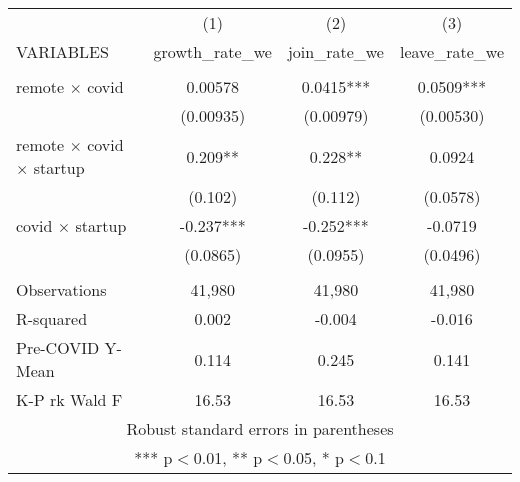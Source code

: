 \begin{tabular}{lccc} \hline
 & (1) & (2) & (3) \\
VARIABLES & growth\_rate\_we & join\_rate\_we & leave\_rate\_we \\ \hline
 &  &  &  \\
remote $\times$ covid & 0.00578 & 0.0415*** & 0.0509*** \\
 & (0.00935) & (0.00979) & (0.00530) \\
remote $\times$ covid $\times$ startup & 0.209** & 0.228** & 0.0924 \\
 & (0.102) & (0.112) & (0.0578) \\
covid $\times$ startup & -0.237*** & -0.252*** & -0.0719 \\
 & (0.0865) & (0.0955) & (0.0496) \\
 &  &  &  \\
Observations & 41,980 & 41,980 & 41,980 \\
R-squared & 0.002 & -0.004 & -0.016 \\
Pre-COVID Y-Mean & 0.114 & 0.245 & 0.141 \\
 K-P rk Wald F & 16.53 & 16.53 & 16.53 \\ \hline
\multicolumn{4}{c}{ Robust standard errors in parentheses} \\
\multicolumn{4}{c}{ *** p$<$0.01, ** p$<$0.05, * p$<$0.1} \\
\end{tabular}
